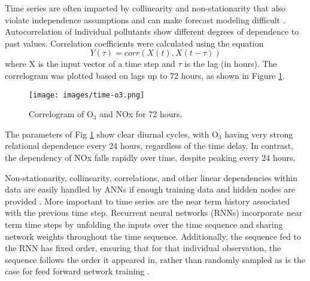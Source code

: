 Time series are often impacted by collinearity and non-stationarity that also violate independence assumptions and can make forecast modeling difficult \citep{Gheyas2011}. Autocorrelation of individual pollutants show different degrees of dependence to past values.  Correlation coefficients were calculated using the equation
%
\begin{equation}
\label{eq:corr}
Y(\tau)= corr(X(t),X(t - \tau))
\end{equation}
%
\noindent
where X is the input vector of a time step and $\tau$ is the lag (in hours). The correlogram was plotted based on lags up to 72 hours, as shown in Figure \ref{fig:serialcorr}.
%
\begin{figure}
\centering
\texttt{[image: images/time-o3.png]}  %
\caption{Correlogram of O$_{3}$ and NOx for 72 hours.}
\label{fig:serialcorr}
\end{figure}
%
The parameters of Fig \ref{fig:serialcorr} show clear diurnal cycles, with O$_{3}$ having very strong relational dependence every 24 hours, regardless of the time delay. In contrast, the dependency of NOx falls rapidly over time, despite peaking every 24 hours. 

Non-stationarity, collinearity, correlations, and other linear dependencies within data are easily handled by ANNs if enough training data and hidden nodes are provided \citep{Goodfellow2016}. More important to time series are the near term history associated with the previous time step. Recurrent neural networks (RNNs) incorporate near term time steps by unfolding the inputs over the time sequence and sharing network weights throughout the time sequence. Additionally, the sequence fed to the RNN has fixed order, ensuring that for that individual observation, the sequence follows the order it appeared in, rather than randomly sampled as is the case for feed forward network training \citep{Elangasinghe2014}.

